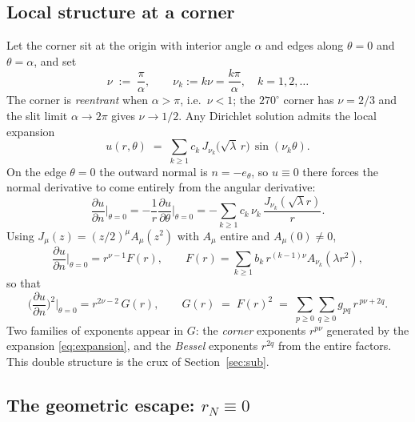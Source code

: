 \documentclass[11pt]{article}
\theoremstyle{remark}
\newcommand{\pd}[2]{\frac{\partial #1}{\partial #2}}
\begin{document}
\subsection{Local structure at a corner}

Let the corner sit at the origin with interior angle $\alpha$ and edges along
$\theta=0$ and $\theta=\alpha$, and set
\begin{equation}
  \nu \;:=\; \frac{\pi}{\alpha}, \qquad \nu_k := k\nu = \frac{k\pi}{\alpha},
  \quad k=1,2,\dots
\end{equation}
The corner is \emph{reentrant} when $\alpha>\pi$, i.e.\ $\nu<1$; the
$270^\circ$ corner has $\nu=2/3$ and the slit limit $\alpha\to2\pi$ gives
$\nu\to1/2$. Any Dirichlet solution admits the local expansion
\begin{equation}\label{eq:expansion}
  u(r,\theta) \;=\; \sum_{k\ge1} c_k\, J_{\nu_k}\!\big(\sqrt{\lambda}\,r\big)\,
                    \sin(\nu_k\theta).
\end{equation}
On the edge $\theta=0$ the outward normal is $n=-e_\theta$, so $u\equiv0$ there
forces the normal derivative to come entirely from the angular derivative:
\begin{equation}\label{eq:dudn}
  \pd{u}{n}\bigg|_{\theta=0}
  = -\frac1r\pd{u}{\theta}\bigg|_{\theta=0}
  = -\sum_{k\ge1} c_k\,\nu_k\,\frac{J_{\nu_k}(\sqrt\lambda r)}{r}.
\end{equation}
Using $J_{\mu}(z)=(z/2)^{\mu}A_\mu(z^2)$ with $A_\mu$ entire and $A_\mu(0)\neq0$,
\begin{equation}\label{eq:dudn2}
  \pd{u}{n}\bigg|_{\theta=0} = r^{\nu-1}F(r),
  \qquad
  F(r)=\sum_{k\ge1}b_k\, r^{(k-1)\nu}A_{\nu_k}(\lambda r^2),
\end{equation}
so that
\begin{equation}\label{eq:G}
  \Big(\pd{u}{n}\Big)^{\!2}\bigg|_{\theta=0} = r^{2\nu-2}\,G(r),
  \qquad
  G(r) \;=\; F(r)^2 \;=\; \sum_{p\ge0}\sum_{q\ge0} g_{pq}\, r^{\,p\nu+2q}.
\end{equation}
Two families of exponents appear in $G$: the \emph{corner} exponents $r^{p\nu}$
generated by the expansion \eqref{eq:expansion}, and the \emph{Bessel} exponents
$r^{2q}$ from the entire factors. This double structure is the crux of
Section~\ref{sec:sub}.

\subsection{The geometric escape: $r_N\equiv0$}
\end{document}
